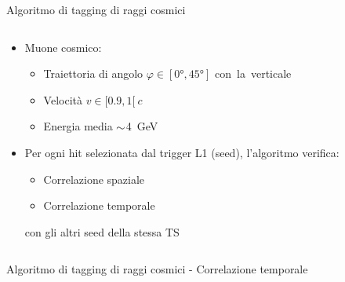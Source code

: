 \documentclass[aspectratio=169]{beamer}
\begin{document}
  \begin{frame}{Algoritmo di tagging di raggi cosmici}
      \begin{columns}[onlytextwidth,T]
      \begin{column}{.60\linewidth}
      \begin{itemize}
          \item Muone cosmico:
              \begin{itemize}
                  \item Traiettoria di angolo $\varphi \in [0°, 45°]$ \mbox{con la verticale}
                  \item Velocità $v \in [0.9, 1[\ c$
                \item Energia media $\small\sim$\SI{4}{\GeV}
              \end{itemize}
          \item Per ogni hit selezionata dal trigger L1 (seed), l'algoritmo verifica:
              \begin{itemize}
          \item Correlazione spaziale
          \item Correlazione temporale
              \end{itemize}
              con gli altri seed della stessa TS
      \end{itemize}
      \end{column}
      \begin{column}{.45\linewidth}
      \end{column}
    \end{columns}
  \end{frame}
  \begin{frame}{Algoritmo di tagging di raggi cosmici - Correlazione temporale}
      \begin{columns}[onlytextwidth,T]
      \begin{column}{.45\linewidth}
          
      \end{column}
      \begin{column}{.45\linewidth}
      \end{column}
    \end{columns}
  \end{frame}
\end{document}
